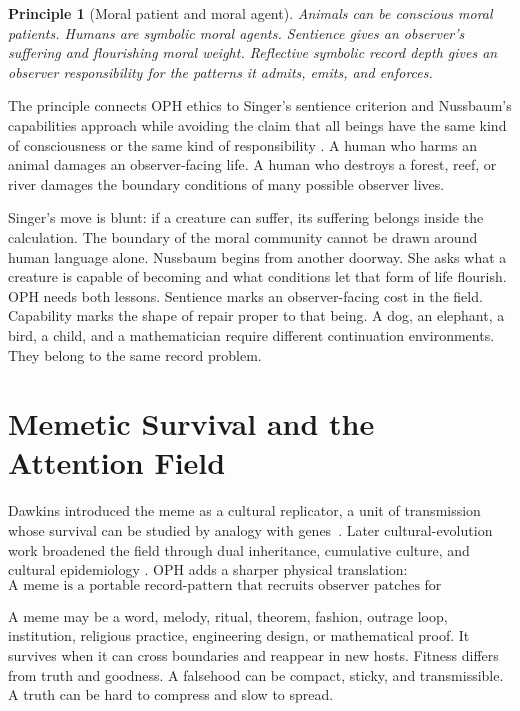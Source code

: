 \documentclass[11pt]{article}
\newtheorem{principle}[definition]{Principle}
\theoremstyle{remark}
\theoremstyle{plain}
\begin{document}
\begin{principle}[Moral patient and moral agent]
Animals can be conscious moral patients. Humans are symbolic moral agents.
Sentience gives an observer's suffering and flourishing moral weight.
Reflective symbolic record depth gives an observer responsibility for the
patterns it admits, emits, and enforces.
\end{principle}

The principle connects OPH ethics to Singer's sentience criterion and
Nussbaum's capabilities approach while avoiding the claim that all beings have
the same kind of consciousness or the same kind of responsibility
\cite{Singer1975,Nussbaum2006,Nussbaum2023}. A human who harms an animal
damages an observer-facing life. A human who destroys a forest, reef, or river
damages the boundary conditions of many possible observer lives.

Singer's move is blunt: if a creature can suffer, its suffering belongs inside
the calculation. The boundary of the moral community cannot be drawn around
human language alone. Nussbaum begins from another doorway. She asks what a
creature is capable of becoming and what conditions let that form of life
flourish. OPH needs both lessons. Sentience marks an observer-facing cost in
the field. Capability marks the shape of repair proper to that being. A dog, an
elephant, a bird, a child, and a mathematician require different continuation
environments. They belong to the same record problem.

\section{Memetic Survival and the Attention Field}

Dawkins introduced the meme as a cultural replicator, a unit of transmission
whose survival can be studied by analogy with genes~\cite{Dawkins1976}. Later
cultural-evolution work broadened the field through dual inheritance,
cumulative culture, and cultural epidemiology
\cite{SEPCulturalEvolution,BoydRicherson1985,Henrich2015,Sperber1996}. OPH
adds a sharper physical translation:
\[
\boxed{
\text{A meme is a portable record-pattern that recruits observer patches for replication.}
}
\]

A meme may be a word, melody, ritual, theorem, fashion, outrage loop,
institution, religious practice, engineering design, or mathematical proof. It
survives when it can cross boundaries and reappear in new hosts. Fitness differs
from truth and goodness. A falsehood can be compact, sticky, and transmissible.
A truth can be hard to compress and slow to spread.
\end{document}

